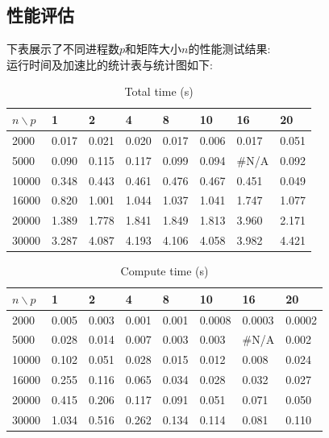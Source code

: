 \documentclass[UTF8, onecolumn, a4paper]{article}
\begin{document}
\subsection{性能评估}
下表展示了不同进程数$p$和矩阵大小$n$的性能测试结果:\\
运行时间及加速比的统计表与统计图如下:
\begin{table}[htb]
	\centering
	\begin{tabular}{l|lllllll}
		\hline
		$n \backslash p$& 1 & 2 & 4 & 8 & 10 & 16 & 20 \\ \hline
		2000 & 0.017 & 0.021 & 0.020 & 0.017 & 0.006 & 0.017 & 0.051 \\ \hline
		5000 & 0.090 & 0.115 & 0.117 & 0.099 & 0.094 & \#N/A & 0.092 \\ \hline
		10000 & 0.348 & 0.443 & 0.461 & 0.476 & 0.467 & 0.451 & 0.049 \\ \hline
		16000 & 0.820 & 1.001 & 1.044 & 1.037 & 1.041 & 1.747 & 1.077 \\ \hline
		20000 & 1.389 & 1.778 & 1.841 & 1.849 & 1.813 & 3.960 & 2.171 \\ \hline
		30000 & 3.287 & 4.087 & 4.193 & 4.106 & 4.058 & 3.982 & 4.421 \\ \hline
	\end{tabular}
	\caption{Total time (s)}
\end{table}
\begin{table}[htb]
	\centering
	\begin{tabular}{l|lllllll}
		\hline
		$n \backslash p$& 1 & 2 & 4 & 8 & 10 & 16 & 20 \\ \hline
		2000 & 0.005 & 0.003 & 0.001 & 0.001 & 0.0008 & 0.0003 & 0.0002 \\ \hline
		5000 & 0.028 & 0.014 & 0.007 & 0.003 & 0.003 & \#N/A & 0.002 \\ \hline
		10000 & 0.102 & 0.051 & 0.028 & 0.015 & 0.012 & 0.008 & 0.024 \\ \hline
		16000 & 0.255 & 0.116 & 0.065 & 0.034 & 0.028 & 0.032 & 0.027 \\ \hline
		20000 & 0.415 & 0.206 & 0.117 & 0.091 & 0.051 & 0.071 & 0.050 \\ \hline
		30000 & 1.034 & 0.516 & 0.262 & 0.134 & 0.114 & 0.081 & 0.110 \\ \hline
	\end{tabular}
	\caption{Compute time (s)}
\end{table}
\end{document}
